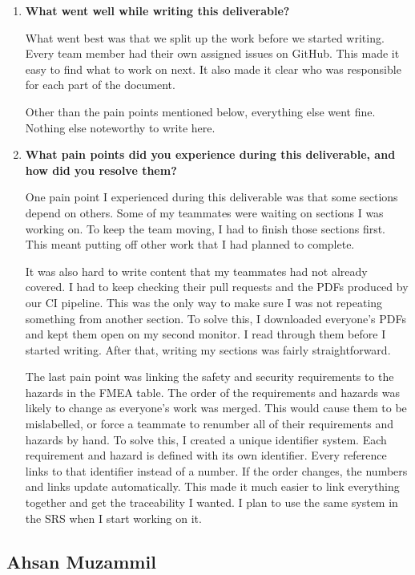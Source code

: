 \documentclass{article}
\newcounter{hazard}
\begin{document}
\begin{enumerate}
    \item \textbf{What went well while writing this deliverable?}

    What went best was that we split up the work before we started writing. Every
    team member had their own assigned issues on GitHub. This made it easy to find
    what to work on next. It also made it clear who was responsible for each part
    of the document.

    Other than the pain points mentioned below, everything else went fine. Nothing
    else noteworthy to write here.

    \item \textbf{What pain points did you experience during this deliverable,
    and how did you resolve them?}

    One pain point I experienced during this deliverable was that some sections
    depend on others. Some of my teammates were waiting on sections I was working
    on. To keep the team moving, I had to finish those sections first. This meant
    putting off other work that I had planned to complete.

    It was also hard to write content that my teammates had not already covered. I
    had to keep checking their pull requests and the PDFs produced by our CI
    pipeline. This was the only way to make sure I was not repeating something from
    another section. To solve this, I downloaded everyone's PDFs and kept them open
    on my second monitor. I read through them before I started writing. After that,
    writing my sections was fairly straightforward.

    The last pain point was linking the safety and security requirements to the
    hazards in the FMEA table. The order of the requirements and hazards was likely
    to change as everyone's work was merged. This would cause them to be
    mislabelled, or force a teammate to renumber all of their requirements and
    hazards by hand. To solve this, I created a unique identifier system. Each
    requirement and hazard is defined with its own identifier. Every reference
    links to that identifier instead of a number. If the order changes, the numbers
    and links update automatically. This made it much easier to link everything
    together and get the traceability I wanted. I plan to use the same system in
    the SRS when I start working on it.
\end{enumerate}

\subsection*{Ahsan Muzammil}
\end{document}
